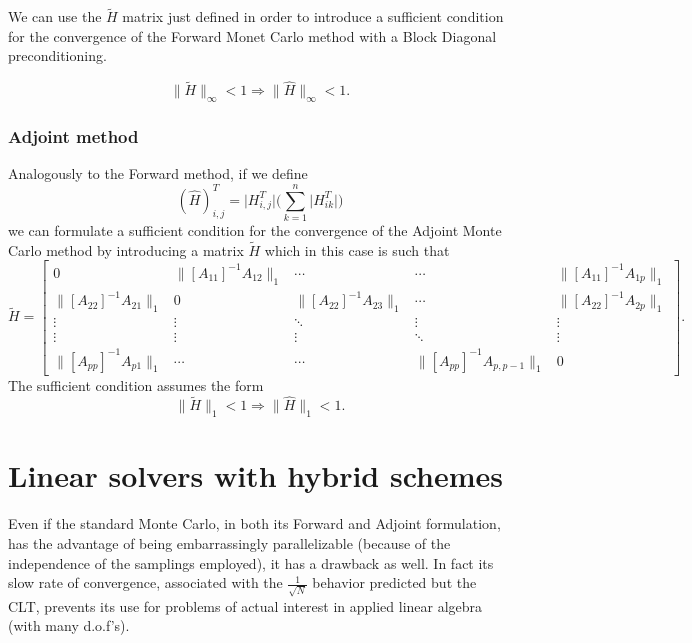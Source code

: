 \documentclass[a4paper,10pt]{article}
\begin{document}
We can use the $\tilde{H}$ matrix just defined in order to introduce a 
sufficient condition for the convergence of the Forward Monet Carlo method with 
a Block Diagonal preconditioning.

\begin{equation}
 \lVert \tilde{H} \rVert_{\infty}<1 \Rightarrow \lVert \hat{H} 
\rVert_{\infty}<1.
\end{equation}

\subsubsection*{Adjoint method} 
Analogously to the Forward method, if we define 
\[
(\hat{H})^T_{i,j} = \lvert H^T_{i,j}\rvert\bigg(\sum_{k=1}^n\lvert 
H^T_{ik}\rvert\bigg)
\]
we can formulate a sufficient condition for the convergence of the Adjoint 
Monte 
Carlo method by introducing a matrix $\tilde{H}$ which in this case is such that
\[
  \tilde{H}=\begin{bmatrix}0 & \lVert [A_{11}]^{-1}A_{12}\rVert_{1} & \cdots 
&
\cdots & \lVert [A_{11}]^{-1}A_{1p}\rVert_{1} \\
\lVert [A_{22}]^{-1}A_{21}\rVert_{1} & 0 & \lVert 
[A_{22}]^{-1}A_{23}\rVert_{1} & 
\cdots & \lVert [A_{22}]^{-1}A_{2p}\rVert_{1} \\
\vdots & \vdots & \ddots & \vdots & \vdots\\
\vdots & \vdots & \vdots &\ddots & \vdots \\
\lVert [A_{pp}]^{-1}A_{p1}\rVert_{1} &  \cdots & \cdots& 
\lVert [A_{pp}]^{-1}A_{p,p-1}\rVert_{1} & 0
\end{bmatrix}.
\]
The sufficient condition assumes the form
\begin{equation}
 \lVert \tilde{H} \rVert_{1}<1 \Rightarrow \lVert \hat{H} \rVert_{1}<1.
\end{equation}

\section{Linear solvers with hybrid schemes}

Even if the standard Monte Carlo, in both its Forward and Adjoint formulation, 
has the advantage of being embarrassingly parallelizable (because of the 
independence of the samplings employed), it has a drawback as 
well. In fact its slow rate of convergence, associated with the 
$\frac{1}{\sqrt{N}}$ behavior predicted but the CLT, prevents its use for 
problems of actual interest in applied linear algebra (with many d.o.f's).
\end{document}
